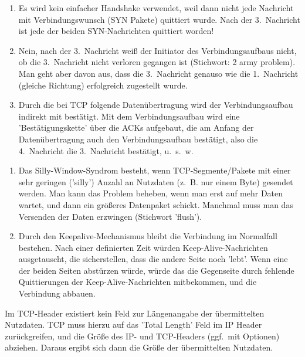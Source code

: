 
\begin{enumerate}
    \item Es wird kein einfacher Handshake verwendet, weil dann nicht jede Nachricht mit Verbindungswunsch (SYN Pakete) quittiert wurde.
    Nach der 3.\ Nachricht ist jede der beiden SYN-Nachrichten quittiert worden!
    \item Nein, nach der 3.\ Nachricht weiß der Initiator des Verbindungsaufbaus nicht, ob die 3.\ Nachricht nicht verloren gegangen ist (Stichwort: 2 army problem).
    Man geht aber davon aus, dass die 3.\ Nachricht genauso wie die 1.\ Nachricht (gleiche Richtung) erfolgreich zugestellt wurde.
    \item Durch die bei TCP folgende Datenübertragung wird der Verbindungsaufbau indirekt mit bestätigt.
    Mit dem Verbindungsaufbau wird eine 'Bestätigungskette' über die ACKs aufgebaut, die am Anfang der Datenübertragung auch den Verbindungsaufbau bestätigt, also die 4.\ Nachricht die 3.\ Nachricht bestätigt, u.\ s.\ w.
\end{enumerate}

\begin{enumerate}
    \item Das Silly-Window-Syndrom besteht, wenn TCP-Segmente/Pakete mit einer sehr geringen ('silly') Anzahl an Nutzdaten (z.\ B. nur einem Byte) gesendet werden.
    Man kann das Problem beheben, wenn man erst auf mehr Daten wartet, und dann ein größeres Datenpaket schickt.
    Manchmal muss man das Versenden der Daten erzwingen (Stichwort 'flush').
    \item Durch den Keepalive-Mechanismus bleibt die Verbindung im Normalfall bestehen.
    Nach einer definierten Zeit würden Keep-Alive-Nachrichten ausgetauscht, die sicherstellen, dass die andere Seite noch 'lebt'.
    Wenn eine der beiden Seiten abstürzen würde, würde das die Gegenseite durch fehlende Quittierungen der Keep-Alive-Nachrichten mitbekommen, und die Verbindung abbauen.
\end{enumerate}

Im TCP-Header existiert kein Feld zur Längenangabe der übermittelten Nutzdaten.
TCP muss hierzu auf das 'Total Length' Feld im IP Header zurückgreifen, und die Größe des IP- und TCP-Headers (ggf.\ mit Optionen) abziehen.
Daraus ergibt sich dann die Größe der übermittelten Nutzdaten.

